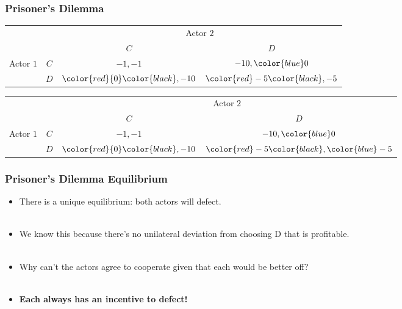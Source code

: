 \documentclass{beamer}
\begin{document}
 \begin{frame} 
 \frametitle{\LARGE{Prisoner's Dilemma}}
 \begin{table}
 	\LARGE
 	\begin{tabular}{cc|c|c|}
 		& \multicolumn{1}{c}{} & \multicolumn{2}{c}{Actor $2$}\\
 		& \multicolumn{1}{c}{} & \multicolumn{1}{c}{$C$}  & \multicolumn{1}{c}{$D$} \\\cline{3-4}
 	{Actor $1$}  & $C$ & $-1,-1$ & $-10,\color{blue}0$ \\\cline{3-4}
 		& $D$ & $\color{red}{0}\color{black},-10$ & $\color{red}-5\color{black},-5$ \\\cline{3-4}
 	\end{tabular}
 \end{table}
 \end{frame}

 \begin{frame}
 \begin{table}
 	\LARGE
 	\begin{tabular}{cc|c|c|}
 		& \multicolumn{1}{c}{} & \multicolumn{2}{c}{Actor $2$}\\
 		& \multicolumn{1}{c}{} & \multicolumn{1}{c}{$C$}  & \multicolumn{1}{c}{$D$} \\\cline{3-4}
 	{Actor $1$}  & $C$ & $-1,-1$ & $-10,\color{blue}0$ \\\cline{3-4}
 		& $D$ & $\color{red}{0}\color{black},-10$ & $\color{red}-5\color{black},\color{blue}-5$ \\\cline{3-4}
 	\end{tabular}
 \end{table}
 \end{frame}

 \begin{frame} 
 \frametitle{\LARGE{Prisoner's Dilemma Equilibrium}}
 	\begin{itemize}
 		\item There is a unique equilibrium: both actors will defect. \pause \\~\\
 		\item We know this because there's no unilateral deviation from choosing D that is profitable. \pause \\~\\
 		\item Why can't the actors agree to cooperate given that each would be better off? \pause \\~\\
 		\item \textbf{Each always has an incentive to defect!}
 	\end{itemize}
 \end{frame}
\end{document}
